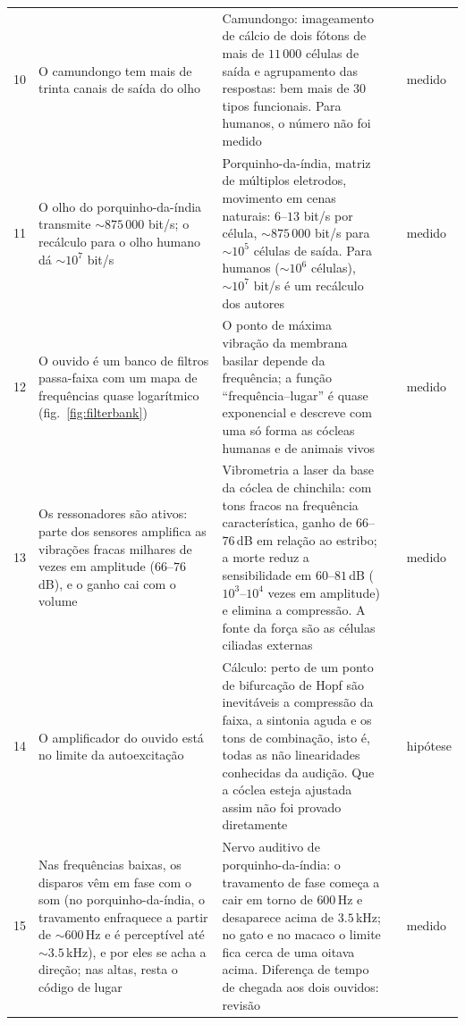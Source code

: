 {\begin{longtable}{>{\raggedright}p{0.5cm}>{\raggedright}p{4.0cm}>{\raggedright}p{5.6cm}>{\raggedright}p{2.3cm}>{\raggedright\arraybackslash}p{1.7cm}}
10 & O camundongo tem mais de trinta canais de saída do olho & Camundongo: imageamento de cálcio de dois fótons de mais de $11\,000$ células de saída e agrupamento das respostas: bem mais de $30$ tipos funcionais. Para humanos, o número não foi medido & \cite{Baden2016} & medido \\
11 & O olho do porquinho-da-índia transmite $\sim875\,000$ bit/s; o recálculo para o olho humano dá $\sim10^7$ bit/s & Porquinho-da-índia, matriz de múltiplos eletrodos, movimento em cenas naturais: $6$--$13$ bit/s por célula, $\sim875\,000$ bit/s para $\sim10^5$ células de saída. Para humanos ($\sim10^6$ células), $\sim10^7$ bit/s é um recálculo dos autores & \cite{Koch2006} & medido \\
12 & O ouvido é um banco de filtros passa-faixa com um mapa de frequências quase logarítmico (fig.~\ref{fig:filterbank}) & O ponto de máxima vibração da membrana basilar depende da frequência; a função ``frequência--lugar'' é quase exponencial e descreve com uma só forma as cócleas humanas e de animais vivos & \cite{Greenwood1990,Robles2001} & medido \\
13 & Os ressonadores são ativos: parte dos sensores amplifica as vibrações fracas milhares de vezes em amplitude ($66$--$76$\,dB), e o ganho cai com o volume & Vibrometria a laser da base da cóclea de chinchila: com tons fracos na frequência característica, ganho de $66$--$76$\,dB em relação ao estribo; a morte reduz a sensibilidade em $60$--$81$\,dB ($10^3$--$10^4$ vezes em amplitude) e elimina a compressão. A fonte da força são as células ciliadas externas & \cite{Ruggero1997,Robles2001} & medido \\
14 & O amplificador do ouvido está no limite da autoexcitação & Cálculo: perto de um ponto de bifurcação de Hopf são inevitáveis a compressão da faixa, a sintonia aguda e os tons de combinação, isto é, todas as não linearidades conhecidas da audição. Que a cóclea esteja ajustada assim não foi provado diretamente & \cite{Eguiluz2000} & hipótese \\
15 & Nas frequências baixas, os disparos vêm em fase com o som (no porquinho-da-índia, o travamento enfraquece a partir de $\sim600$\,Hz e é perceptível até $\sim3.5$\,kHz), e por eles se acha a direção; nas altas, resta o código de lugar & Nervo auditivo de porquinho-da-índia: o travamento de fase começa a cair em torno de $600$\,Hz e desaparece acima de $3.5$\,kHz; no gato e no macaco o limite fica cerca de uma oitava acima. Diferença de tempo de chegada aos dois ouvidos: revisão & \cite{PalmerRussell1986,Grothe2010} & medido \\

\end{longtable}}
